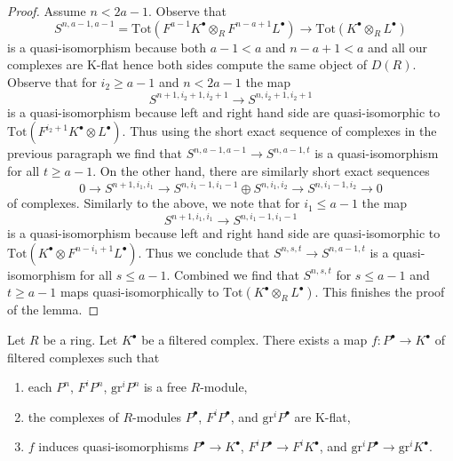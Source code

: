 \begin{proof}
\medskip\noindent
Assume $n < 2a - 1$. Observe that
$$
S^{n, a - 1, a - 1} =
\text{Tot}(F^{a - 1}K^\bullet \otimes_R F^{n - a + 1}L^\bullet)
\to \text{Tot}(K^\bullet \otimes_R L^\bullet)
$$
is a quasi-isomorphism because both $a - 1 < a$ and $n - a + 1 < a$
and all our complexes are K-flat hence both sides compute the
same object of $D(R)$.
Observe that for $i_2 \geq a - 1$ and $n < 2a - 1$ the map
$$
S^{n + 1, i_2 + 1, i_2 + 1} \to S^{n, i_2 + 1, i_2 + 1}
$$
is a quasi-isomorphism because left and right hand side are quasi-isomorphic
to $\text{Tot}(F^{i_2 + 1}K^\bullet \otimes L^\bullet)$.
Thus using the short exact
sequence of complexes in the previous paragraph we find that
$S^{n, a - 1, a - 1} \to S^{n, a - 1, t}$ is a quasi-isomorphism for
all $t \geq a - 1$. On the other hand, there are similarly short
exact sequences
$$
0 \to
S^{n + 1, i_1, i_1}
\to
S^{n, i_1 - 1, i_1 - 1} \oplus
S^{n, i_1, i_2}
\to
S^{n, i_1 - 1, i_2}
\to
0
$$
of complexes. Similarly to the above, we note that for $i_1 \leq a - 1$
the map
$$
S^{n + 1, i_1, i_1} \to S^{n, i_1 - 1, i_1 - 1}
$$
is a quasi-isomorphism because left and right hand side are quasi-isomorphic
to $\text{Tot}(K^\bullet \otimes F^{n - i_1 + 1}L^\bullet)$.
Thus we conclude that $S^{n, s, t} \to S^{n, a - 1, t}$ is a quasi-isomorphism
for all $s \leq a - 1$. Combined we find that $S^{n, s, t}$ for $s \leq a - 1$
and $t \geq a - 1$ maps quasi-isomorphically to
$\text{Tot}(K^\bullet \otimes_R L^\bullet)$.
This finishes the proof of the lemma.
\end{proof}

\begin{lemma}
\label{lemma-resolution-filtered-complex}
Let $R$ be a ring. Let $K^\bullet$ be a filtered complex. There exists a
map $f : P^\bullet \to K^\bullet$ of filtered complexes such that
\begin{enumerate}
\item each $P^n$, $F^iP^n$, $\text{gr}^iP^n$ is a free $R$-module,
\item the complexes of $R$-modules $P^\bullet$, $F^iP^\bullet$, and
$\text{gr}^iP^\bullet$ are K-flat,
\item $f$ induces quasi-isomorphisms
$P^\bullet \to K^\bullet$,
$F^iP^\bullet \to F^iK^\bullet$, and
$\text{gr}^iP^\bullet \to \text{gr}^iK^\bullet$.
\end{enumerate}
\end{lemma}

